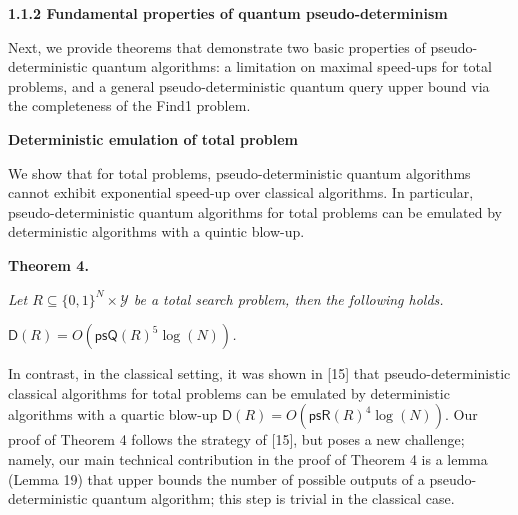 \documentclass[10pt,a4paper]{article}
\begin{document}
\par\medskip\noindent\textbf{
1.1.2 Fundamental properties of quantum pseudo-determinism}\par




Next, we provide theorems that demonstrate two basic properties of pseudo-deterministic quantum algorithms: a limitation on maximal speed-ups for total problems, and a general pseudo-deterministic quantum query upper bound via the completeness of the Find1 problem.\par




\par\medskip\noindent\textbf{Deterministic emulation of total problem}\par




We show that for total problems, pseudo-deterministic quantum algorithms cannot exhibit exponential speed-up over classical algorithms. In particular, pseudo-deterministic quantum algorithms for total problems can be emulated by deterministic algorithms with a quintic blow-up.\par





\par\medskip\noindent\textbf{
\textbf{Theorem 4}\textbf{.}
}\par



\emph{Let ${R}\subseteq\{0,1\}^{N}\times\mathcal{Y}$ be a total search problem, then the following holds.}\par




$\mathsf{D}(R)=O(\mathsf{psQ}(R)^{5}\log(N))$\emph{.}\par






In contrast, in the classical setting, it was shown in [15] that pseudo-deterministic classical algorithms for total problems can be emulated by deterministic algorithms with a quartic blow-up $\mathsf{D}(R)=O(\mathsf{psR}(R)^{4}\log(N))$. Our proof of Theorem 4 follows the strategy of [15], but poses a new challenge; namely, our main technical contribution in the proof of Theorem 4 is a lemma (Lemma 19) that upper bounds the number of possible outputs of a pseudo-deterministic quantum algorithm; this step is trivial in the classical case.\par
\end{document}
